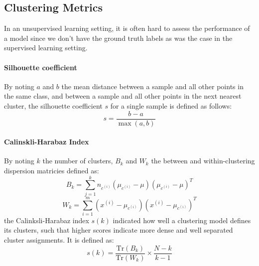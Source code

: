\subsection{Clustering Metrics}
In an unsupervised learning setting, it is often hard to assess the
performance of a model since we don't have the ground truth labels as was
the case in the supervised learning setting.
\paragraph{Silhouette coefficient} By noting $a$ and $b$ the
mean distance between a sample and all other points in the same class,
and between a sample and all other points in the next nearest cluster,
the silhouette coefficient $s$ for a single sample is defined as follows:
\begin{equation}
  s = \frac{b - a}{\max(a, b)}
\end{equation}
\paragraph{Calinskli-Harabaz Index} By noting $k$ the number of clusters, $B_k$
and $W_k$ the between and within-clustering dispersion matricies defined as:
\begin{equation}
  B_k=\sum_{j=1}^kn_{c^{(i)}}(\mu_{c^{(i)}}-\mu)(\mu_{c^{(i)}}-\mu)^T
\end{equation}
\begin{equation}
  W_k=\sum_{i=1}^m(x^{(i)}-\mu_{c^{(i)}})(x^{(i)}-\mu_{c^{(i)}})^T
\end{equation}
the Calinksli-Harabaz index $s(k)$ indicated how well a clustering model
defines its clusters, such that higher scores indicate more dense and well
separated cluster assignments. It is defined as:
\begin{equation}
  s(k)=\frac{\textrm{Tr}(B_k)}{\textrm{Tr}(W_k)}\times\frac{N-k}{k-1}
\end{equation}

